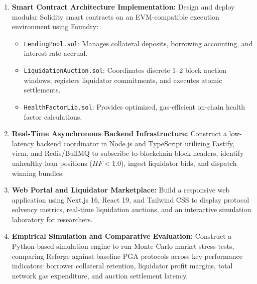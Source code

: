 \begin{enumerate}
\begin{figure}[htbp]
    \caption{Reforge batch auction workflow from unhealthy position detection to optimal single-transaction settlement.}
    \label{fig:batch_auction_workflow}
    \end{figure}

    \item \textbf{Smart Contract Architecture Implementation:}
    Design and deploy modular Solidity smart contracts on an EVM-compatible execution environment using Foundry:
    \begin{itemize}
        \item \texttt{LendingPool.sol}: Manages collateral deposits, borrowing accounting, and interest rate accrual.
        \item \texttt{LiquidationAuction.sol}: Coordinates discrete 1--2 block auction windows, registers liquidator commitments, and executes atomic settlements.
        \item \texttt{HealthFactorLib.sol}: Provides optimized, gas-efficient on-chain health factor calculations.
    \end{itemize}

    \item \textbf{Real-Time Asynchronous Backend Infrastructure:}
    Construct a low-latency backend coordinator in Node.js and TypeScript utilizing Fastify, viem, and Redis/BullMQ to subscribe to blockchain block headers, identify unhealthy loan positions ($HF < 1.0$), ingest liquidator bids, and dispatch winning bundles.

    \item \textbf{Web Portal and Liquidator Marketplace:}
    Build a responsive web application using Next.js 16, React 19, and Tailwind CSS to display protocol solvency metrics, real-time liquidation auctions, and an interactive simulation laboratory for researchers.

    \item \textbf{Empirical Simulation and Comparative Evaluation:}
    Construct a Python-based simulation engine to run Monte Carlo market stress tests, comparing Reforge against baseline PGA protocols across key performance indicators: borrower collateral retention, liquidator profit margins, total network gas expenditure, and auction settlement latency.
\end{enumerate}

